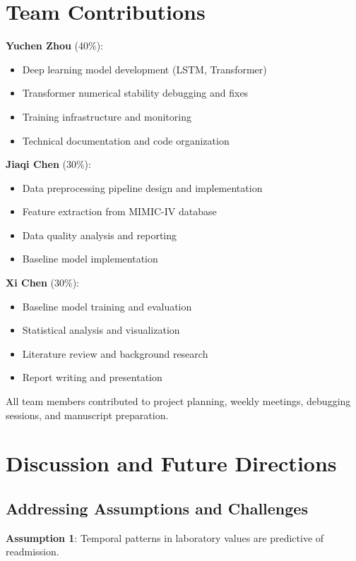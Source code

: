 \documentclass[conference]{IEEEtran}
\begin{document}
\section{Team Contributions}

\textbf{Yuchen Zhou} (40\%):
\begin{itemize}
    \item Deep learning model development (LSTM, Transformer)
    \item Transformer numerical stability debugging and fixes
    \item Training infrastructure and monitoring
    \item Technical documentation and code organization
\end{itemize}

\textbf{Jiaqi Chen} (30\%):
\begin{itemize}
    \item Data preprocessing pipeline design and implementation
    \item Feature extraction from MIMIC-IV database
    \item Data quality analysis and reporting
    \item Baseline model implementation
\end{itemize}

\textbf{Xi Chen} (30\%):
\begin{itemize}
    \item Baseline model training and evaluation
    \item Statistical analysis and visualization
    \item Literature review and background research
    \item Report writing and presentation
\end{itemize}

All team members contributed to project planning, weekly meetings, debugging sessions, and manuscript preparation.

\section{Discussion and Future Directions}

\subsection{Addressing Assumptions and Challenges}

\textbf{Assumption 1}: Temporal patterns in laboratory values are predictive of readmission.
\end{document}
